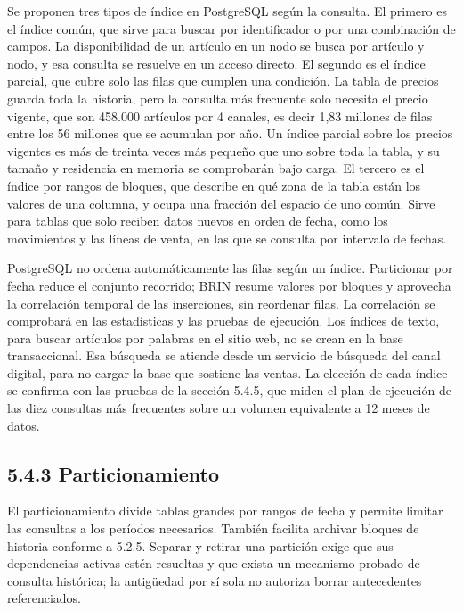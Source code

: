 \documentclass[11pt]{article}
\begin{document}
Se proponen tres tipos de índice en PostgreSQL según la consulta. El primero es el índice común, que sirve para buscar por identificador o por una combinación de campos. La disponibilidad de un artículo en un nodo se busca por artículo y nodo, y esa consulta se resuelve en un acceso directo. El segundo es el índice parcial, que cubre solo las filas que cumplen una condición. La tabla de precios guarda toda la historia, pero la consulta más frecuente solo necesita el precio vigente, que son 458.000 artículos por 4 canales, es decir 1,83 millones de filas entre los 56 millones que se acumulan por año. Un índice parcial sobre los precios vigentes es más de treinta veces más pequeño que uno sobre toda la tabla, y su tamaño y residencia en memoria se comprobarán bajo carga. El tercero es el índice por rangos de bloques, que describe en qué zona de la tabla están los valores de una columna, y ocupa una fracción del espacio de uno común. Sirve para tablas que solo reciben datos nuevos en orden de fecha, como los movimientos y las líneas de venta, en las que se consulta por intervalo de fechas.

PostgreSQL no ordena automáticamente las filas según un índice. Particionar por fecha reduce el conjunto recorrido; BRIN resume valores por bloques y aprovecha la correlación temporal de las inserciones, sin reordenar filas. La correlación se comprobará en las estadísticas y las pruebas de ejecución. Los índices de texto, para buscar artículos por palabras en el sitio web, no se crean en la base transaccional. Esa búsqueda se atiende desde un servicio de búsqueda del canal digital, para no cargar la base que sostiene las ventas. La elección de cada índice se confirma con las pruebas de la sección 5.4.5, que miden el plan de ejecución de las diez consultas más frecuentes sobre un volumen equivalente a 12 meses de datos.

\subsection{5.4.3 Particionamiento}

El particionamiento divide tablas grandes por rangos de fecha y permite limitar las consultas a los períodos necesarios. También facilita archivar bloques de historia conforme a 5.2.5. Separar y retirar una partición exige que sus dependencias activas estén resueltas y que exista un mecanismo probado de consulta histórica; la antigüedad por sí sola no autoriza borrar antecedentes referenciados.
\end{document}
